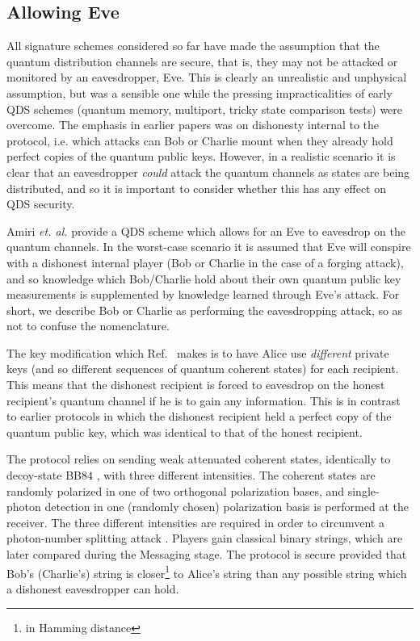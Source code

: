 \subsection{Allowing Eve}
All signature schemes considered so far have made the assumption that the quantum distribution channels are secure, that is, they may not be attacked or monitored by an eavesdropper, Eve. This is clearly an unrealistic and unphysical assumption, but was a sensible one while the pressing impracticalities of early QDS schemes (quantum memory, multiport, tricky state comparison tests) were overcome. The emphasis in earlier papers was on dishonesty internal to the protocol, i.e. which attacks can Bob or Charlie mount when they already hold perfect copies of the quantum public keys. However, in a realistic scenario it is clear that an eavesdropper \emph{could} attack the quantum channels as states are being distributed, and so it is important to consider whether this has any effect on QDS security.

Amiri \emph{et. al.} provide a QDS scheme which allows for an Eve to eavesdrop on the quantum channels. In the worst-case scenario it is assumed that Eve will conspire with a dishonest internal player (Bob or Charlie in the case of a forging attack), and so knowledge which Bob/Charlie hold about their own quantum public key measurements is supplemented by knowledge learned through Eve's attack. For short, we describe Bob or Charlie as performing the eavesdropping attack, so as not to confuse the nomenclature. 

The key modification which Ref.~\cite{Amiri2016} makes is to have Alice use \emph{different} private keys (and so different sequences of quantum coherent states) for each recipient. This means that the dishonest recipient is forced to eavesdrop on the honest recipient's quantum channel if he is to gain any information. This is in contrast to earlier protocols in which the dishonest recipient held a perfect copy of the quantum public key, which was identical to that of the honest recipient. 



The protocol relies on sending weak attenuated coherent states, identically to decoy-state BB$84$ , with three different intensities. The coherent states are randomly polarized in one of two orthogonal polarization bases, and single-photon detection in one (randomly chosen) polarization basis is performed at the receiver. The three different intensities are required in order to circumvent a photon-number splitting attack . Players gain classical binary strings, which are later compared during the Messaging stage. The protocol is secure provided that Bob's (Charlie's) string is closer\footnote{in Hamming distance} to Alice's string than any possible string which a dishonest eavesdropper can hold. 

